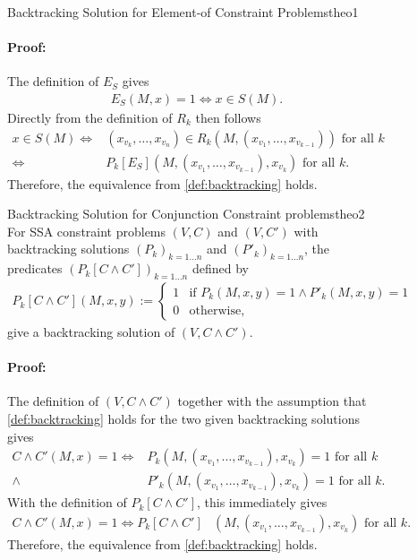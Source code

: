 \begin{figure}[p]
\begin{theorem}{Backtracking Solution for Element-of Constraint Problems}{theo1}
        \paragraph*{Proof:} The definition of $E_S$ gives 
        \begin{align*}
            E_S(M,x)=1\iff x\in S(M).
        \end{align*}
        Directly from the definition of $R_k$ then follows
        \begin{align*}
            x\in S(M)\iff{}&(x_{v_k},\dots,x_{v_n})\in R_k(M,(x_{v_1},\dots,x_{v_{k-1}}))\text{ for all }k\\
                     \iff{}&P_k[E_S](M,(x_{v_1},\dots,x_{v_{k-1}}),x_{v_k})\text{ for all }k.
        \end{align*}
        Therefore, the equivalence from \autoref{def:backtracking} holds.
    \end{theorem}
    \begin{theorem}{Backtracking Solution for Conjunction Constraint problems}{theo2}
        For SSA constraint problems $(V,C)$ and $(V,C')$ with backtracking
        solutions $(P_k)_{k=1\dots n}$ and $(P'_k)_{k=1\dots n}$, the
        predicates $(P_k[C\mathrel\land C'])_{k=1\dots n}$ defined by
        \begin{align*}
            P_k[C\mathrel\land C'](M,x,y):=\left\{
                \begin{array}{ll}
                    1&\text{if }P_k(M,x,y)=1\mathrel\land P'_k(M,x,y)=1\\
                    0&\text{otherwise},
                \end{array}\right.
        \end{align*}
        give a backtracking solution of $(V,C\mathrel\land C')$.
        \tcblower
        \paragraph*{Proof:}
        The definition of $(V,C\mathrel\land C')$ together with the
        assumption that \autoref{def:backtracking} holds for the two given
        backtracking solutions gives
        \begin{align*}
            C\mathrel\land C'(M,x)=1\iff{}& P_k(M,(x_{v_1},\dots,x_{v_{k-1}}),x_{v_k})=1\text{ for all }k\\
                                  \mathrel\land{}& P'_k(M,(x_{v_1},\dots,x_{v_{k-1}}),x_{v_k})=1\text{ for all }k.
        \end{align*}
        With the definition of $P_k[C\mathrel\land C']$, this immediately gives
        \begin{align*}
            C\mathrel\land C'(M,x)=1\iff P_k[C\mathrel\land C']&(M,(x_{v_1},\dots,x_{v_{k-1}}),x_{v_k})\text{ for all }k.
        \end{align*}
        Therefore, the equivalence from \autoref{def:backtracking} holds.
    \end{theorem}
\end{figure}

